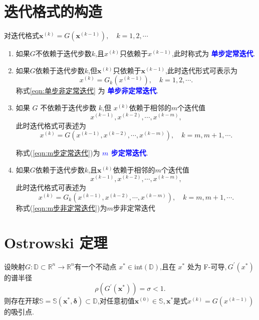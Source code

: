 \documentclass{lzureport}
\begin{document}
\section{迭代格式的构造}
对迭代格式$\boldsymbol{x}^{(k)}=G\left(\boldsymbol{x}^{(k-1)}\right),\quad k=1,2,\cdots $

\begin{enumerate}[label=\arabic*)]
	\item 如果$G$不依赖于迭代步数$k$,且$x^{(k)}$只依赖于$x^(k-1)$,此时称式为 \textcolor{blue}{\textbf{单步定常迭代}}.
	\item 如果$G$依赖于迭代步数$k$,但$\boldsymbol x^(k)$只依赖于$\boldsymbol x^(k-1)$,此时迭代形式可表示为
	\begin{equation}
	x^{(k)}=G_k\left(x^{(k-1)}\right),\quad k=1,2,\cdots.
	\end{equation}\label{eqn:单步非定常迭代}	
	称式\ref{eqn:单步非定常迭代} 为 \textcolor{blue}{\textbf{单步非定常迭代}}.
	\item 如果 $G$ 不依赖于迭代步数 $k$,但 $x^{(k)}$依赖于相邻的$m$个迭代值
	$$x^{(k-1)},x^{(k-2)},\cdots,x^{(k-m)},$$
	此时迭代格式可表述为
	\begin{equation}
	x^{(k)}=G\left(x^{(k-1)},x^{(k-2)},\cdots,x^{(k-m)}\right),\quad k=m,m+1,\cdots.
	\end{equation}\label{eqn:m步定常迭代}
	
	称式(\ref{eqn:m步定常迭代})为 \textcolor{blue}{\textbf{$m$ 步定常迭代}}.
	\item 如果$G$依赖于迭代步数$k$,且$\boldsymbol x^(k)$依赖于相邻的$m$个迭代值
	$$x^{(k-1)},x^{(k-2)},\cdots,x^{(k-m)},$$
	此时迭代格式可表述为
	\begin{equation}
	x^{(k)}=G_k\left(x^{(k-1)},x^{(k-2)},\cdots,x^{(k-m)}\right),\quad k=m,m+1,\cdots.
	\end{equation}\label{eqn:m步非定常迭代}
	称式(\ref{eqn:m步非定常迭代})为$m$步非定常迭代
\end{enumerate}

\section{Ostrowski 定理}

设映射$G:\mathbb{D}\subset\mathbb{R}^n\to\mathbb{R}^n$有一个不动点 $x^*\in$int$(\mathbb{D})$,且在 $x^*$ 处为 F-可导$,G^\prime\left(x^*\right)$ 的谱半径
$$\rho\left(G^{\prime}\left(\boldsymbol{x}^*\right)\right)=\sigma<1.$$
则存在开球$\mathbb{S}=\mathbb{S}(\boldsymbol{x}^*,\boldsymbol{\delta})\subset\mathbb{D}$,对任意初值$\boldsymbol{x}^{(0)}\in\mathbb{S},\boldsymbol{x}^*$是式$x^{(k)} = G(x^{(k-1)}) $的吸引点.
\end{document}

